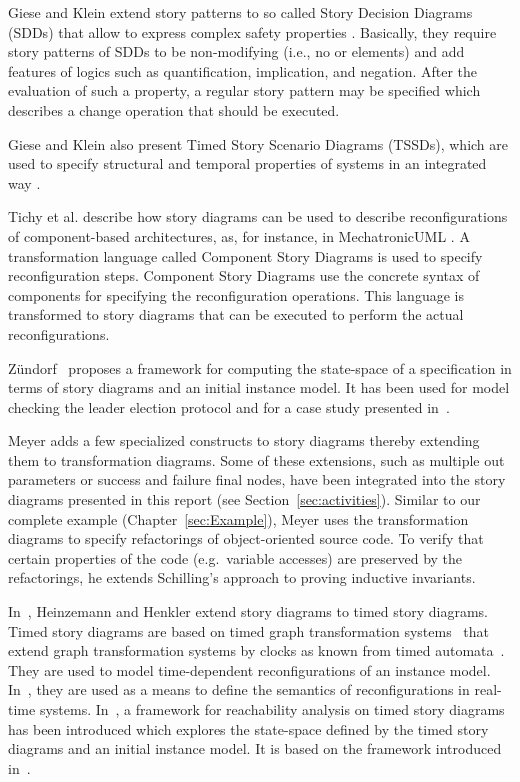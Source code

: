 Giese and Klein extend story patterns to so called Story Decision Diagrams (SDDs) that allow to express complex safety properties \cite{GK06a}.
Basically, they require story patterns of SDDs to be non-modifying (i.e., no \create or \destroy elements) and add features of logics such as quantification, implication, and negation.
After the evaluation of such a property, a regular story pattern may be specified which describes a change operation that should be executed.

Giese and Klein also present Timed Story Scenario Diagrams (TSSDs), which are used to specify structural and temporal properties of systems in an integrated way \cite{KG07a}.

Tichy et al. \cite{THH+08} describe how story diagrams can be used to describe reconfigurations of component-based architectures, as, for instance, in MechatronicUML \cite{BBD+12}.
A transformation language called Component Story Diagrams is used to specify reconfiguration steps.
Component Story Diagrams use the concrete syntax of components for specifying the reconfiguration operations.
This language is transformed to story diagrams that can be executed to perform the actual reconfigurations.

Z{\"u}ndorf~\cite{Zue09} proposes a framework for computing the state-space of a specification in terms of story diagrams and an initial instance model. 
It has been used for model checking the leader election protocol and for a case study presented in~\cite{HSJZ10}.

Meyer \cite{Mey09} adds a few specialized constructs to story diagrams thereby extending them to transformation diagrams. Some of these extensions, such as multiple out parameters or success and failure final nodes, have been integrated into the story diagrams presented in this report (see Section~\ref{sec:activities}). Similar to our complete example (Chapter~\ref{sec:Example}), Meyer uses the transformation diagrams to specify refactorings of object-oriented source code. To verify that certain properties of the code (e.g.\ variable accesses) are preserved by the refactorings, he extends Schilling's approach \cite{Sch06} to proving inductive invariants.

In~\cite{HH11b}, Heinzemann and Henkler extend story diagrams to timed story diagrams. 
Timed story diagrams are based on timed graph transformation systems~\cite{EHH+11} that extend graph transformation systems by clocks as known from timed automata~\cite{AD94}. 
They are used to model time-dependent reconfigurations of an instance model. 
In~\cite{EHH+11}, they are used as a means to define the semantics of reconfigurations in real-time systems. 
In~\cite{HSE10}, a framework for reachability analysis on timed story diagrams has been introduced which explores the state-space defined by the timed story diagrams and an initial instance model. 
It is based on the framework introduced in~\cite{Zue09}.

